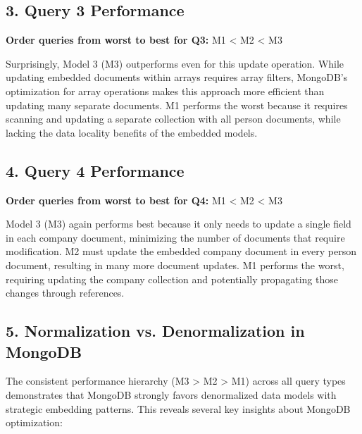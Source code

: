 \subsection*{3. Query 3 Performance}
\textbf{Order queries from worst to best for Q3:} M1 < M2 < M3

Surprisingly, Model 3 (M3) outperforms even for this update operation. While updating embedded documents within arrays requires array filters, MongoDB's optimization for array operations makes this approach more efficient than updating many separate documents. M1 performs the worst because it requires scanning and updating a separate collection with all person documents, while lacking the data locality benefits of the embedded models.

\subsection*{4. Query 4 Performance}
\textbf{Order queries from worst to best for Q4:} M1 < M2 < M3

Model 3 (M3) again performs best because it only needs to update a single field in each company document, minimizing the number of documents that require modification. M2 must update the embedded company document in every person document, resulting in many more document updates. M1 performs the worst, requiring updating the company collection and potentially propagating those changes through references.

\subsection*{5. Normalization vs. Denormalization in MongoDB}

The consistent performance hierarchy (M3 > M2 > M1) across all query types demonstrates that MongoDB strongly favors denormalized data models with strategic embedding patterns. This reveals several key insights about MongoDB optimization:

